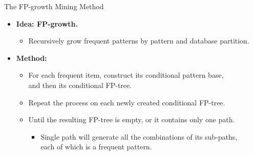 \begin{frame}{The FP-growth Mining Method}
	\centering
	\begin{itemize}
		\item \textbf{Idea: FP-growth.}
		      \begin{itemize}
			      \item Recursively grow frequent patterns by pattern and database
			            partition.
		      \end{itemize}
		\item \textbf{Method:}
		      \begin{itemize}
			      \item For each frequent item, construct its conditional pattern
			            base, \\
			            and then its conditional FP-tree.
			      \item Repeat the process on each newly created conditional FP-tree.
			      \item Until the resulting FP-tree is empty, or it contains only one
			            path.
			            \begin{itemize}
				            \item Single path will generate all the combinations of its
				                  sub-paths, \\
				                  each of which is a frequent pattern.
			            \end{itemize}
		      \end{itemize}
	\end{itemize}
\end{frame}

